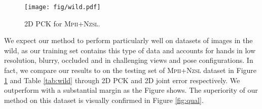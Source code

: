 \documentclass[10pt,twocolumn,letterpaper]{article}
\begin{document}
\begin{figure}[h!]
\center
\texttt{[image: fig/wild.pdf]}
\vspace{-8pt}
\caption{2D PCK for \textsc{Mpii+Nzsl}.}
\label{fig:pck_wild}
\end{figure}

\vspace{-5pt}
\begin{table}[h!]
\center
{}
\vspace{-5pt}
\caption{Average re-projected 2D joint distance (px) to ground-truth for \textsc{Mpii+Nzsl}}
\label{tab:wild}
\end{table}

We expect our method to perform particularly well on datasets of images in the wild, as our training set contains this type of data and accounts for hands in low resolution, blurry, occluded and in challenging views and pose configurations. In fact, we compare our results to \cite{zimmermann2017learning} on the testing set of \textsc{Mpii+Nzsl} dataset in Figure \ref{fig:pck_wild} and Table \ref{tab:wild} through 2D PCK and 2D joint error respectively. We outperform \cite{zimmermann2017learning} with a substantial margin as the Figure shows. The superiority of our method on this dataset is visually confirmed in Figure \ref{fig:qual}.
\end{document}
